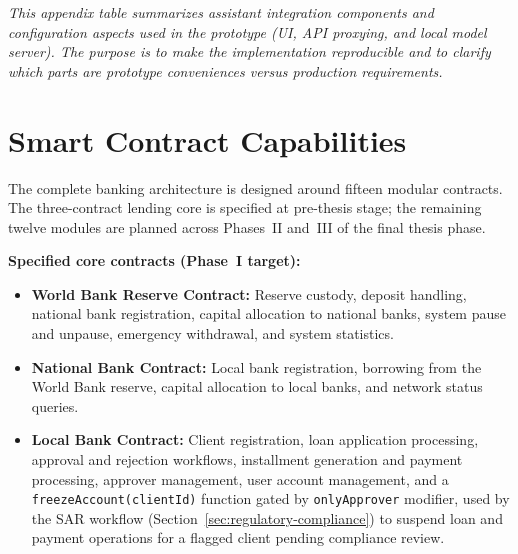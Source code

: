 \documentclass[12pt,a4paper]{report}
\begin{document}
\vspace{2pt}
\noindent\textit{\small This appendix table summarizes assistant integration components and configuration aspects used in the prototype (UI, API proxying, and local model server). The purpose is to make the implementation reproducible and to clarify which parts are prototype conveniences versus production requirements.}

\chapter{Smart Contract Capabilities}

The complete banking architecture is designed around fifteen modular contracts. The three-contract lending core is specified at pre-thesis stage; the remaining twelve modules are planned across Phases~II and~III of the final thesis phase.

\textbf{Specified core contracts (Phase~I target):}
\begin{itemize}[noitemsep]
\item \textbf{World Bank Reserve Contract:} Reserve custody, deposit handling, national bank registration, capital allocation to national banks, system pause and unpause, emergency withdrawal, and system statistics.
\item \textbf{National Bank Contract:} Local bank registration, borrowing from the World Bank reserve, capital allocation to local banks, and network status queries.
\item \textbf{Local Bank Contract:} Client registration, loan application processing, approval and rejection workflows, installment generation and payment processing, approver management, user account management, and a \texttt{freezeAccount(clientId)} function gated by \texttt{onlyApprover} modifier, used by the SAR workflow (Section~\ref{sec:regulatory-compliance}) to suspend loan and payment operations for a flagged client pending compliance review.
\end{itemize}
\end{document}
